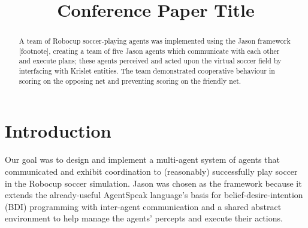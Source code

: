 \documentclass[conference]{IEEEtran}
\begin{document}
\title{Conference Paper Title}

\author{
\and
{}
\and
{}
\and
{}
}

\maketitle

\begin{abstract}
A team of Robocup soccer-playing agents was implemented using the Jason framework [footnote], creating a team of five Jason agents which communicate with each other and execute plans; these agents perceived and acted upon the virtual soccer field by interfacing with Krislet entities. The team demonstrated cooperative behaviour in scoring on the opposing net and preventing scoring on the friendly net.
\end{abstract}

\section{Introduction}
Our goal was to design and implement a multi-agent system of agents that communicated and exhibit coordination to (reasonably) successfully play soccer in the Robocup soccer simulation. Jason was chosen as the framework because it extends the already-useful AgentSpeak language’s basis for belief-desire-intention (BDI) programming with inter-agent communication and a shared abstract environment to help manage the agents’ percepts and execute their actions. 
\end{document}

